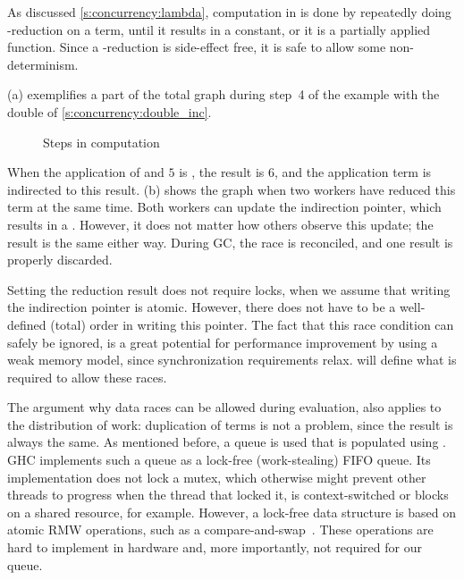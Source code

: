 As discussed \cref{s:concurrency:lambda}, computation in \lcalc is done by repeatedly doing \fxbeta-reduction on a term, until it results in a constant, or it is a partially applied function.
Since a \fxbeta-reduction is side-effect free, it is safe to allow some non-determinism.

(a) exemplifies a part of the total graph during step~4 of the example with the double  of \cref{s:concurrency:double_inc}.
\begin{figure}%
%
\caption{Steps in computation}%
\label{fig:concurrency:computation}%
\end{figure}%
When the application of  and $5$ is , the result is $6$, and the application term is indirected to this result.
(b) shows the graph when two workers have reduced this term at the same time.
Both workers can update the indirection pointer, which results in a .
However, it does not matter how others observe this update; the result is the same either way.
During \ac{GC}, the race is reconciled, and one result is properly discarded.

Setting the reduction result does not require locks, when we assume that writing the indirection pointer is atomic.
However, there does not have to be a well-defined (total) order in writing this pointer.
The fact that this race condition can safely be ignored, is a great potential for performance improvement by using a weak memory model, since synchronization requirements relax.
 will define what is required to allow these races.

The argument why data races can be allowed during evaluation, also applies to the distribution of work: duplication of terms is not a problem, since the result is always the same.
As mentioned before, a queue is used that is populated using .
\Ac{GHC} implements such a queue as a lock-free (work-stealing) \ac{FIFO} queue.
Its implementation does not lock a mutex, which otherwise might prevent other threads to progress when the thread that locked it, is context-switched or blocks on a shared resource, for example.
However, a lock-free data structure is based on atomic \ac{RMW} operations, such as a compare-and-swap~\cite{herlihy:concurrent_objects}.
These operations are hard to implement in hardware and, more importantly, not required for our queue.

